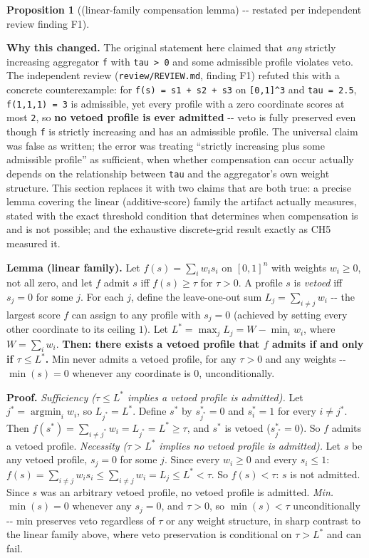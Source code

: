 \documentclass[11pt,a4paper]{article}
\theoremstyle{definition}
\newtheorem{proposition}{Proposition}
\begin{document}
\begin{proposition}[(linear-family compensation lemma) -{}- restated per independent review finding F1]
\label{prop:1}

\noindent\textbf{Why this changed.} The original statement here claimed that \textit{any} strictly increasing aggregator \texttt{f} with \texttt{tau > 0} and some admissible profile violates veto. The independent review (\texttt{review/REVIEW.md}, finding F1) refuted this with a concrete counterexample: for \texttt{f(s) = s1 + s2 + s3} on \texttt{[0,1]\textasciicircum3} and \texttt{tau = 2.5}, \texttt{f(1,1,1) = 3} is admissible, yet every profile with a zero coordinate scores at most \texttt{2}, so \textbf{no vetoed profile is ever admitted} -{}- veto is fully preserved even though \texttt{f} is strictly increasing and has an admissible profile. The universal claim was false as written; the error was treating ``strictly increasing plus some admissible profile'' as sufficient, when whether compensation can occur actually depends on the relationship between \texttt{tau} and the aggregator's own weight structure. This section replaces it with two claims that are both true: a precise lemma covering the linear (additive-score) family the artifact actually measures, stated with the exact threshold condition that determines when compensation is and is not possible; and the exhaustive discrete-grid result exactly as CH5 measured it.

\noindent\textbf{Lemma (linear family).} Let $f(s) = \sum_i w_i s_i$ on $[0,1]^n$ with weights $w_i \geq 0$, not all zero, and let $f$ admit $s$ iff $f(s) \geq \tau$ for $\tau > 0$. A profile $s$ is \textit{vetoed} iff $s_j = 0$ for some $j$. For each $j$, define the leave-one-out sum $L_j = \sum_{i \neq j} w_i$ -{}- the largest score $f$ can assign to any profile with $s_j = 0$ (achieved by setting every other coordinate to its ceiling $1$). Let $L^* = \max_j L_j = W - \min_i w_i$, where $W = \sum_i w_i$. \textbf{Then: there exists a vetoed profile that $f$ admits if and only if $\tau \leq L^*$.} Min never admits a vetoed profile, for any $\tau > 0$ and any weights -{}- $\min(s) = 0$ whenever any coordinate is $0$, unconditionally.

\noindent\textbf{Proof.}
\textit{Sufficiency ($\tau \leq L^*$ implies a vetoed profile is admitted).} Let $j^* = \operatorname{argmin}_i w_i$, so $L_{j^*} = L^*$. Define $s^*$ by $s^*_{j^*} = 0$ and $s^*_i = 1$ for every $i \neq j^*$. Then $f(s^*) = \sum_{i \neq j^*} w_i = L_{j^*} = L^* \geq \tau$, and $s^*$ is vetoed ($s^*_{j^*} = 0$). So $f$ admits a vetoed profile.
\textit{Necessity ($\tau > L^*$ implies no vetoed profile is admitted).} Let $s$ be any vetoed profile, $s_j = 0$ for some $j$. Since every $w_i \geq 0$ and every $s_i \leq 1$: $f(s) = \sum_{i \neq j} w_i s_i \leq \sum_{i \neq j} w_i = L_j \leq L^* < \tau$. So $f(s) < \tau$: $s$ is not admitted. Since $s$ was an arbitrary vetoed profile, no vetoed profile is admitted.
\textit{Min.} $\min(s) = 0$ whenever any $s_j = 0$, and $\tau > 0$, so $\min(s) < \tau$ unconditionally -{}- min preserves veto regardless of $\tau$ or any weight structure, in sharp contrast to the linear family above, where veto preservation is conditional on $\tau > L^*$ and can fail.


\end{proposition}
\end{document}
